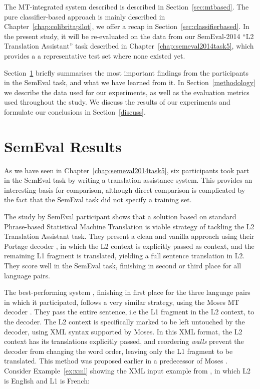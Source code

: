 The MT-integrated system described is described in Section~\ref{sec:mtbased}.
The pure classifier-based approach is mainly described in
Chapter~\ref{chap:colibritapilot}, we offer a recap in
Section~\ref{sec:classifierbased}. In the present study, it will be re-evaluated on the
data from our SemEval-2014 ``L2 Translation Assistant'' task
described in Chapter~\ref{chap:semeval2014task5}, which provides a
a representative test set where none existed yet.

Section~\ref{previous} briefly summarises the most important findings from the
participants in the SemEval task, and what we have learned from it.  In
Section~\ref{methodology} we describe the data used for our experiments, as
well as the evaluation metrics used throughout the study. We discuss the
results of our experiments and formulate our conclusions in
Section~\ref{discuss}.

\section{SemEval Results} %
\label{previous}
\label{sec:participants}

As we have seen in Chapter~\ref{chap:semeval2014task5}, six participants took part in the SemEval task by writing a
translation assistance system. This provides an interesting basis for comparison, although direct comparison is
complicated by the fact that the SemEval task did not specify a training set.

The study by SemEval participant \cite{CNRC} shows that a solution based on
standard Phrase-based Statistical Machine Translation is viable strategy of
tackling the L2 Translation Assistant task. They present a clean and vanilla
approach using their Portage decoder \citep{PORTAGE}, in which the L2 context
is explicitly passed as context, and the remaining L1 fragment is translated,
yielding a full sentence translation in L2. They score well in the SemEval
task, finishing in second or third place for all language pairs.

The best-performing system \citep{UEDIN}, finishing in first place for
the three language pairs in which it participated, follows a very similar
strategy, using the Moses MT decoder \citep{MOSES}. They pass the
entire sentence, i.e the L1 fragment in the L2 context, to the
decoder. The L2 context is specifically marked to be left untouched by
the decoder, using XML syntax supported by Moses. In this XML format,
the L2 context has its translations explicitly passed, and reordering
\emph{walls} prevent the decoder from changing the word order, leaving only
the L1 fragment to be translated. This method was proposed
earlier in a predecessor of Moses \citep{Cabezas+05}. Consider
Example~\ref{ex:xml} showing the XML input example from \cite{UEDIN},
in which L2 is English and L1 is French:

